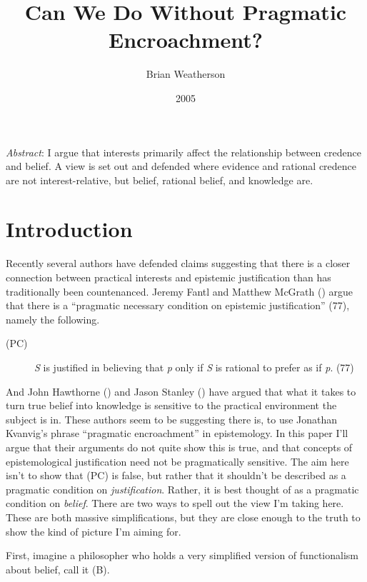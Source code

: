 \documentclass[
  11pt,
  letterpaper,
  DIV=11,
  numbers=noendperiod,
  twoside]{scrartcl}
\title{Can We Do Without Pragmatic Encroachment?}
\author{Brian Weatherson}
\date{2005}
\renewenvironment{abstract}
 {\vspace{-1.25cm}
 \quotation\small\noindent\emph{Abstract}:}
 {\endquotation}
\begin{document}
\maketitle
\begin{abstract}
I argue that interests primarily affect the relationship between
credence and belief. A view is set out and defended where evidence and
rational credence are not interest-relative, but belief, rational
belief, and knowledge are.
\end{abstract}


\section{Introduction}\label{introduction}

Recently several authors have defended claims suggesting that there is a
closer connection between practical interests and epistemic
justification than has traditionally been countenanced. Jeremy Fantl and
Matthew McGrath () argue that there is a
``pragmatic necessary condition on epistemic justification'' (77),
namely the following.

\begin{description}
\item[(PC)]
\emph{S} is justified in believing that \emph{p} only if \emph{S} is
rational to prefer as if \emph{p}. (77)
\end{description}

And John Hawthorne () and Jason
Stanley () have argued that what
it takes to turn true belief into knowledge is sensitive to the
practical environment the subject is in. These authors seem to be
suggesting there is, to use Jonathan Kvanvig's phrase ``pragmatic
encroachment'' in epistemology. In this paper I'll argue that their
arguments do not quite show this is true, and that concepts of
epistemological justification need not be pragmatically sensitive. The
aim here isn't to show that (PC) is false, but rather that it shouldn't
be described as a pragmatic condition on \emph{justification}. Rather,
it is best thought of as a pragmatic condition on \emph{belief}. There
are two ways to spell out the view I'm taking here. These are both
massive simplifications, but they are close enough to the truth to show
the kind of picture I'm aiming for.

First, imagine a philosopher who holds a very simplified version of
functionalism about belief, call it (B).
\end{document}

